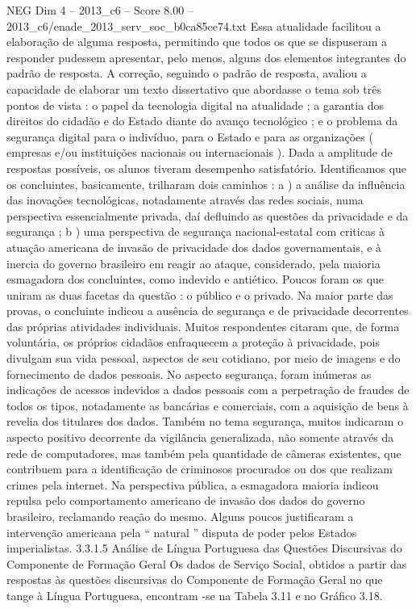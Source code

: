 \begin{textsample}{NEG Dim 4 – 2013\_c6 – Score 8.00 – 2013\_c6/enade\_2013\_serv\_soc\_b0ca85ce74.txt}
Essa atualidade facilitou a elaboração de alguma resposta, permitindo que todos os que se dispuseram a responder pudessem apresentar, pelo menos, alguns dos elementos integrantes do padrão de resposta.
A correção, seguindo o padrão de resposta, avaliou a capacidade de elaborar um texto dissertativo que abordasse o tema sob três pontos de vista : o papel da tecnologia digital na atualidade ; a garantia dos direitos do cidadão e do Estado diante do avanço tecnológico ; e o problema da segurança digital para o indivíduo, para o Estado e para as organizações ( empresas e/ou instituições nacionais ou internacionais ).
Dada a amplitude de respostas possíveis, os alunos tiveram desempenho satisfatório.
Identificamos que os concluintes, basicamente, trilharam dois caminhos : a ) a análise da influência das inovações tecnológicas, notadamente através das redes sociais, numa perspectiva essencialmente privada, daí defluindo as questões da privacidade e da segurança ; b ) uma perspectiva de segurança nacional-estatal com criticas à atuação americana de invasão de privacidade dos dados governamentais, e à inercia do governo brasileiro em reagir ao ataque, considerado, pela maioria esmagadora dos concluintes, como indevido e antiético.
Poucos foram os que uniram as duas facetas da questão : o público e o privado.
Na maior parte das provas, o concluinte indicou a ausência de segurança e de privacidade decorrentes das próprias atividades individuais.
Muitos respondentes citaram que, de forma voluntária, os próprios cidadãos enfraquecem a proteção à privacidade, pois divulgam sua vida pessoal, aspectos de seu cotidiano, por meio de imagens e do fornecimento de dados pessoais.
No aspecto segurança, foram inúmeras as indicações de acessos indevidos a dados pessoais com a perpetração de fraudes de todos os tipos, notadamente as bancárias e comerciais, com a aquisição de bens à revelia dos titulares dos dados.
Também no tema segurança, muitos indicaram o aspecto positivo decorrente da vigilância generalizada, não somente através da rede de computadores, mas também pela quantidade de câmeras existentes, que contribuem para a identificação de criminosos procurados ou dos que realizam crimes pela internet.
Na perspectiva pública, a esmagadora maioria indicou repulsa pelo comportamento americano de invasão dos dados do governo brasileiro, reclamando reação do mesmo.
Alguns poucos justificaram a intervenção americana pela “ natural ” disputa de poder pelos Estados imperialistas. 3.3.1.5 Análise de Língua Portuguesa das Questões Discursivas do Componente de Formação Geral Os dados de Serviço Social, obtidos a partir das respostas às questões discursivas do Componente de Formação Geral no que tange à Língua Portuguesa, encontram -se na Tabela 3.11 e no Gráfico 3.18.

\end{textsample}
